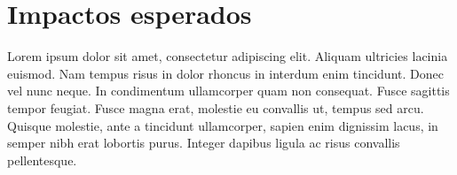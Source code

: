 \section{Impactos esperados}

Lorem ipsum dolor sit amet, consectetur adipiscing elit. Aliquam ultricies lacinia euismod. Nam tempus risus in dolor rhoncus in interdum enim tincidunt. Donec vel nunc neque. In condimentum ullamcorper quam non consequat. Fusce sagittis tempor feugiat. Fusce magna erat, molestie eu convallis ut, tempus sed arcu. Quisque molestie, ante a tincidunt ullamcorper, sapien enim dignissim lacus, in semper nibh erat lobortis purus. Integer dapibus ligula ac risus convallis pellentesque.


